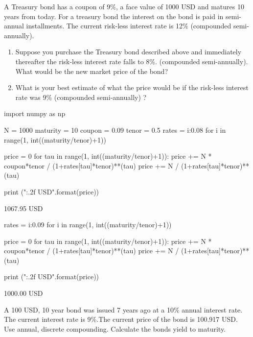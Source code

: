 \begin{question}
A Treasury bond has a coupon of 9\%, a face value of 1000 USD and matures 10 years from today. For a treasury bond the interest on the bond is paid in semi-annual installments. The current risk-less interest rate is 12\% (compounded semi-annually).
\begin{enumerate}
\item Suppose you purchase the Treasury bond described above and immediately thereafter the risk-less interest rate falls to 8\%. (compounded semi-annually). What would be the new market price of the bond?
\item What is your best estimate of what the price would be if the risk-less interest rate was 9\% (compounded semi-annually) ?
\end{enumerate}
\end{question}

\cprotEnv\begin{solution}
\begin{ipython}
import numpy as np

N = 1000
maturity = 10
coupon = 0.09
tenor = 0.5
rates = {i:0.08 for i in range(1, int((maturity/tenor)+1))}

price = 0
for tau in range(1, int((maturity/tenor)+1)):
    price += N * coupon*tenor / (1+rates[tau]*tenor)**(tau)
price += N / (1+rates[tau]*tenor)**(tau) 

print ("{:.2f} USD".format(price))
\end{ipython}
\begin{ioutput}
1067.95 USD
\end{ioutput}

\begin{ipython}
rates = {i:0.09 for i in range(1, int((maturity/tenor)+1))}
	
price = 0
for tau in range(1, int((maturity/tenor)+1)):
    price += N * coupon*tenor / (1+rates[tau]*tenor)**(tau)
price += N / (1+rates[tau]*tenor)**(tau) 
	
print ("{:.2f} USD".format(price))
\end{ipython}
\begin{ioutput}
1000.00 USD
\end{ioutput}
\end{solution}

\begin{question}
A 100 USD, 10 year bond was issued 7 years ago at a 10\% annual interest rate. The current interest rate is 9\%.The current price of the bond is 100.917 USD. Use annual, discrete compounding. Calculate the bonds yield to maturity.
\end{question}

